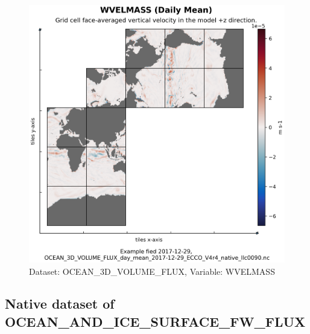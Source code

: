 \begin{figure}[H]
\centering
\includegraphics[scale=0.55]{../images/plots/native_plots/Ocean_Three-Dimensional_Volume_Fluxes/WVELMASS.png}
\caption{Dataset: OCEAN\_3D\_VOLUME\_FLUX, Variable: WVELMASS}
\label{tab:table-OCEAN_3D_VOLUME_FLUX_WVELMASS-Plot}
\end{figure}
\subsection{Native dataset of OCEAN\_AND\_ICE\_SURFACE\_FW\_FLUX}
\newp
